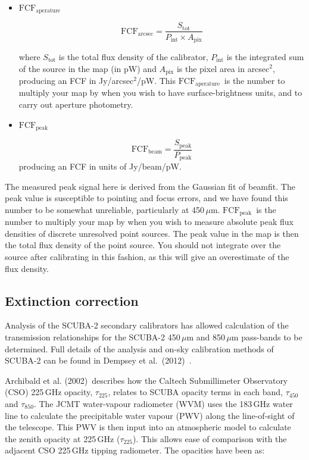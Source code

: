 \documentclass[twoside,11pt]{article}
\newcommand{\xref}[3]{#1}
\newcommand{\xlabel}[1]{}
\renewcommand{\_}{\texttt{\symbol{95}}}
\newcommand{\fcfb}{$\mathrm{FCF_{peak}}$}
\newcommand{\fcfa}{$\mathrm{FCF_{aperature}}$}
\newcommand{\task}[1]{\textsf{#1}}
\newcommand{\beamfit}{\xref{\task{beamfit}}{sun95}{BEAMFIT}}
\begin{document}
\begin{itemize}

\item{\textbf{\fcfa}}

\begin{equation}
\label{eq:fcf_arcsec}
\mathrm{FCF_{arcsec}} = \frac{S_\mathrm{tot}}{P_\mathrm{int} \times
A_\mathrm{pix}}
\end{equation}

where $S_\mathrm{tot}$ is the total flux density of the calibrator,
$P_\mathrm{int}$ is the integrated sum of the source in the map (in
pW) and $A_\mathrm{pix}$ is the pixel area in arcsec$^2$, producing an
FCF in Jy/arcsec$^2$/pW. This \fcfa\ is the number to
multiply your map by when you wish to have surface-brightness units,
and to carry out aperture photometry.

\item{\textbf{\fcfb}}

\begin{equation}
\label{eq:fcf_beam}
\mathrm{FCF_{beam}} = \frac{S_\mathrm{{peak}}}{P_\mathrm{peak}}
\end{equation}
producing an FCF in units of Jy/beam/pW.
\end{itemize}

The measured peak signal here is derived from the Gaussian fit of
\beamfit. The peak value is susceptible to pointing and focus errors,
and we have found this number to be somewhat unreliable, particularly
at 450\,$\mu$m. \fcfb\ is the number to multiply your
map by when you wish to measure absolute peak flux densities of
discrete unresolved point sources. The peak value in the map is then
the total flux density of the point source. You should not integrate
over the source after calibrating in this fashion, as this will give
an overestimate of the flux density.


\subsection{\xlabel{extinction}Extinction correction}

Analysis of the SCUBA-2 secondary calibrators has allowed calculation
of the transmission relationships for the SCUBA-2 450\,$\mu$m and
850\,$\mu$m pass-bands to be determined. Full details of the analysis
and on-sky calibration methods of SCUBA-2 can be found in Dempsey et
al.\ (2012)~\cite{dempsey12}\cite{dempsey-spie}.

Archibald et al. (2002)\,\cite{archibald} describes how the Caltech
Submillimeter Observatory (CSO) 225\,GHz opacity, $\tau_{225}$,
relates to SCUBA opacity terms in each band, $\tau_{450}$ and
$\tau_{850}$. The JCMT water-vapour radiometer (WVM) uses the 183\,GHz
water line to calculate the precipitable water vapour (PWV) along the
line-of-sight of the telescope. This PWV is then input into an
atmospheric model to calculate the zenith opacity at 225\,GHz
($\tau_{225}$). This allows ease of comparison with the adjacent CSO
225\,GHz tipping radiometer. The opacities have been as:
\end{document}
